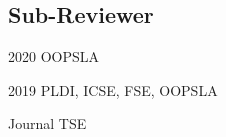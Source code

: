 \documentclass[12pt,letterpaper]{report}
\newcommand{\listitemspace}{0.15em}
\renewenvironment{itemize}
{\begin{list}{}{\setlength{\leftmargin}{0em}
			\setlength{\parskip}{0em}
			\setlength{\itemsep}{\listitemspace}
			\setlength{\parsep}{\listitemspace}}}
	{\end{list}}
\begin{document}
	\subsection*{Sub-Reviewer}
	\begin{tablist}
		\item[2020] \tab OOPSLA
		\item[2019] \tab PLDI, ICSE, FSE, OOPSLA
		\item[Journal] \tab TSE
	\end{tablist}
	
	
%	
%		
%		
%		
%		
%	
%	
%		
%		
%		
%		
	
	
	
%	
%		
%		
%		
%		
%		
%		
%		
%		
%		
%		
%		
	
\end{document}

